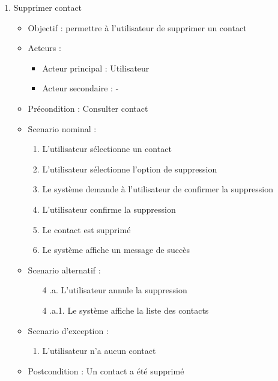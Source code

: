 \begin{enumerate}[label=\alph*.]
	\item Supprimer contact
	\begin{itemize}
		\item Objectif : permettre à l’utilisateur de supprimer un contact
		\item Acteurs :
		\begin{itemize}
			\item Acteur principal : Utilisateur
			\item Acteur secondaire : -
		\end{itemize}
		\item Précondition : Consulter contact
		\item Scenario nominal :
		\begin{enumerate}[label=\arabic*.]
			\item L’utilisateur sélectionne un contact
			\item L’utilisateur sélectionne l’option de suppression
			\item Le système demande à l’utilisateur de confirmer la suppression
			\item L’utilisateur confirme la suppression
			\item Le contact est supprimé
			\item Le système affiche un message de succès
		\end{enumerate}
		\item Scenario alternatif :
		\begin{enumerate}[label=\arabic*.]
			\item[4] .a. L’utilisateur annule la suppression
			\item[4] .a.1. Le système affiche la liste des contacts
		\end{enumerate}
		\item Scenario d’exception : 
		\begin{enumerate}[label=\arabic*.]
			\item L’utilisateur n’a aucun contact
		\end{enumerate}
		\item Postcondition : Un contact a été supprimé
	\end{itemize}
	

\end{enumerate}
